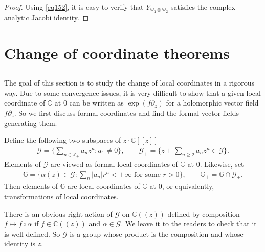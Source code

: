 \documentclass[11pt,b5paper,notitlepage]{article}
\theoremstyle{definition}
\theoremstyle{plain}
\newtheorem{lm}[df]{Lemma}
\newcommand{\mc}{\mathcal}
\newcommand{\Res}{\mathrm{Res}}
\newcommand{\scr}{\mathscr}
\newcommand{\Wbb}{\mathbb W}
\newcommand{\Gbb}{\mathbb G}
\newcommand{\Cbb}{\mathbb C}
\newcommand{\Zbb}{\mathbb Z}
\numberwithin{equation}{section}
\begin{document}
\begin{proof}
Using \eqref{eq152}, it is easy to verify that $Y_{\Wbb_1\otimes\Wbb_2}$ satisfies the complex analytic Jacobi identity.
\end{proof}





\section{Change of coordinate theorems}

\subsection{}

The goal of this section is to study the change of local coordinates in a rigorous way. Due to some convergence issues, it is very difficult to show that a given local coordinate of $\Cbb$ at $0$ can be written as $\exp(f\partial_z)$ for a holomorphic vector field $f\partial_z$. So we first discuss formal coordinates and find the formal vector fields generating them. 

Define the following two subspaces of $z\cdot \Cbb[[z]]$ \index{G@$\scr G,\scr G_+$}
\begin{gather}
\mc G=\Big\{\sum_{n\in\Zbb_+} a_nz^n:a_1\neq 0\Big\},\qquad \mc G_+=\Big\{z+\sum_{n\geq 2} a_nz^n\in\mc G\Big\}.	
\end{gather}
Elements of $\mc G$ are viewed as formal local coordinates of $\Cbb$ at $0$. Likewise, set \index{G@$\Gbb,\Gbb_+$}
\begin{align}
\Gbb=\Big\{\alpha(z)\in\mc G:\sum_n |a_n|r^n<+\infty\text{ for some }r>0\Big\},\qquad \Gbb_+=\Gbb\cap\mc G_+.
\end{align}
Then elements of $\Gbb$ are local coordinates of $\Cbb$ at $0$, or equivalently, transformations of local coordinates.

There is an obvious right action of $\mc G$ on $\Cbb((z))$ defined by composition $f\mapsto f\circ\alpha$ if $f\in\Cbb((z))$ and $\alpha\in\mc G$. We leave it to the readers to check that it is well-defined. So $\mc G$ is a group whose product is the composition and whose identity is $z$.

\end{document}
